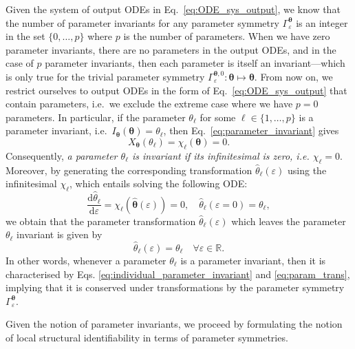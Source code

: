 \documentclass[12pt]{article}
\begin{document}
Given the system of output ODEs in Eq.~\eqref{eq:ODE_sys_output}, we know that the number of parameter invariants for any parameter symmetry $\Gamma_{\varepsilon}^{\boldsymbol{\theta}}$ is an integer in the set $\{0,\ldots,p\}$ where $p$ is the number of parameters. When we have zero parameter invariants, there are no parameters in the output ODEs, and in the case of $p$ parameter invariants, then each parameter is itself an invariant---which is only true for the trivial parameter symmetry $\Gamma_{\varepsilon}^{\boldsymbol{\theta},0}:\boldsymbol{\theta}\mapsto\boldsymbol{\theta}$. From now on, we restrict ourselves to output ODEs in the form of Eq.~\eqref{eq:ODE_sys_output} that contain parameters, i.e.~we exclude the extreme case where we have $p=0$ parameters. In particular, if the parameter $\theta_{\ell}$ for some $\ell\in\{1,\ldots,p\}$ is a parameter invariant, i.e.~$I_{\boldsymbol{\theta}}(\boldsymbol{\theta})=\theta_{\ell}$, then Eq.~\eqref{eq:parameter_invariant} gives
\begin{equation}
  X_{\boldsymbol{\theta}}(\theta_{\ell})=\chi_{\ell}(\boldsymbol{\theta})=0.
\label{eq:individual_parameter_invariant}
\end{equation}
Consequently, \textit{a parameter $\theta_{\ell}$ is invariant if its infinitesimal is zero, i.e. $\chi_{\ell}=0$}. Moreover, by generating the corresponding transformation $\hat{\theta}_{\ell}(\varepsilon)$ using the infinitesimal $\chi_{\ell}$, which entails solving the following ODE:
\begin{equation}
   \frac{\mathrm{d}\hat{\theta}_{\ell}}{\mathrm{d}\varepsilon}=\chi_{\ell}\left(\hat{\boldsymbol{\theta}}(\varepsilon)\right)=0,\quad{\hat{\theta}_{\ell}(\varepsilon=0)=\theta_{\ell}},
  \label{eq:param_trans_eq}
\end{equation}
we obtain that the parameter transformation $\hat{\theta}_{\ell}(\varepsilon)$ which leaves the parameter $\theta_{\ell}$ invariant is given by
\begin{equation}
  \hat{\theta}_{\ell}(\varepsilon)=\theta_{\ell}\quad\forall\varepsilon\in\mathbb{R}.
  \label{eq:param_trans}
\end{equation}
In other words, whenever a parameter $\theta_{\ell}$ is a parameter invariant, then it is characterised by Eqs. \eqref{eq:individual_parameter_invariant} and \eqref{eq:param_trans}, implying that it is conserved under transformations by the parameter symmetry $\Gamma_{\varepsilon}^{\boldsymbol{\theta}}$.

Given the notion of parameter invariants, we proceed by formulating the notion of local structural identifiability in terms of parameter symmetries. 
\end{document}
